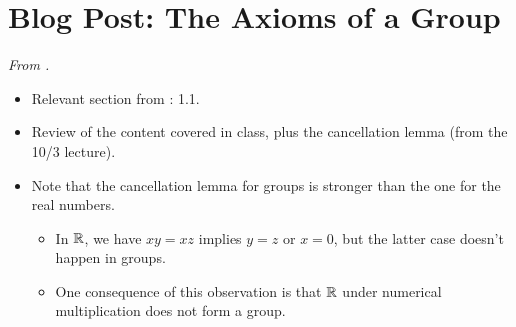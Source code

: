 \documentclass[../notes.tex]{subfiles}
\begin{document}
\section{Blog Post: The Axioms of a Group}
\emph{From \textcite{bib:Calegari}.}
\begin{itemize}
    \item Relevant section from \textcite{bib:DummitFoote}: 1.1.
    \item Review of the content covered in class, plus the cancellation lemma (from the 10/3 lecture).
    \item Note that the cancellation lemma for groups is stronger than the one for the real numbers.
    \begin{itemize}
        \item In $\mathbb{R}$, we have $xy=xz$ implies $y=z$ or $x=0$, but the latter case doesn't happen in groups.
        \item One consequence of this observation is that $\mathbb{R}$ under numerical multiplication does not form a group.
    \end{itemize}
\end{itemize}
\end{document}
